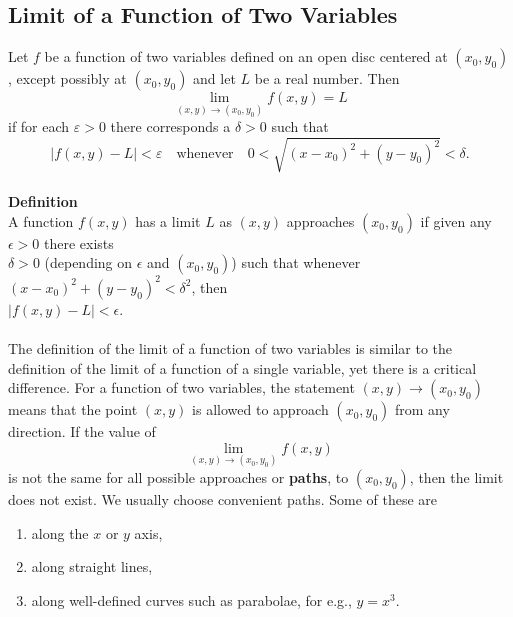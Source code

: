 \documentclass[titlepage,a4paper,12pt]{report}
\begin{document}
\subsection{Limit of a Function of Two Variables}
Let $f$ be a function of two variables defined on an open disc centered at $(x_0,y_0)$, except possibly at $(x_0, y_0)$ and let $L$ be a real number. Then 
\[\lim _{(x,y)\rightarrow (x_0, y_0)}f(x,y)=L\] if for each $\varepsilon >0$ there corresponds a $\delta >0$ such that 
\[|f(x,y)-L|<\varepsilon \quad {\mbox{whenever}}\quad 0<\sqrt{(x-x_0)^2+(y-y_0)^2}<\delta.\]\\
\noindent \textbf{Definition}\\
A function $f(x,y)$ has a limit $L$ as $(x,y)$ approaches $(x_0,y_0)$ if given any $\epsilon>0$ there exists \\$\delta>0$ (depending on $\epsilon$ and $(x_0,y_0)$) such that whenever $(x-x_0)^2+(y-y_0)^2<\delta^2$, then \\$|f(x,y)-L|<\epsilon$.\\~\\
\noindent The definition of the limit of a function of two variables is similar to the definition of the limit of a function of a single variable, yet there is a critical difference. For a function of two variables, the statement $(x,y)\rightarrow (x_0,y_0)$ means that the point $(x,y)$ is allowed to approach $(x_0,y_0)$ from any direction. If the value of \[\lim _{(x,y)\rightarrow (x_0,y_0)}f(x,y)\] is not the same for all possible approaches or \textbf{paths}, to $(x_0,y_0)$, then the limit does not exist. We usually choose convenient paths. Some of these are 
 \begin{enumerate}
 \item along the $x$ or $y$ axis,
 \item along straight lines, 
 \item along well-defined curves such as parabolae, for e.g.,  $y=x^3$.
 \end{enumerate}
 
\end{document}

